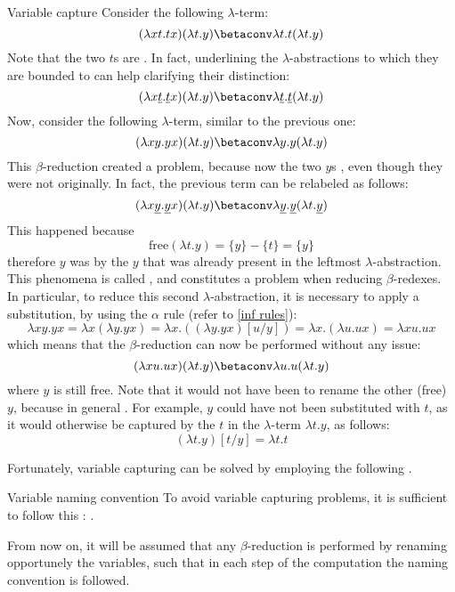 \documentclass[a4paper, 12pt]{report}
\begin{document}
    \begin{framedobs}{Variable capture}
        Consider the following $\lambda$-term: $$(\lambda xt.tx)(\lambda t.y) \betaconv \lambda t.t(\lambda t.y)$$ Note that the two $t$s are . In fact, underlining the $\lambda$-abstractions to which they are bounded to can help clarifying their distinction: $$(\lambda x\underline{t}.\underline{t}x)(\lambda t.y) \betaconv \lambda \underline{t}.\underline{t}(\lambda t.y)$$ Now, consider the following $\lambda$-term, similar to the previous one: $$(\lambda xy.yx)(\lambda t.y) \betaconv \lambda y.y(\lambda t.y)$$ This $\beta$-reduction created a problem, because now the two $y$s , even though they were not originally. In fact, the previous term can be relabeled as follows: $$(\lambda x \underline y. \underline y x)(\lambda t.y) \betaconv \lambda \underline y. \underline y (\lambda t. \underline y)$$ This happened because $$\mathrm{free}(\lambda t.y) = \{y\} - \{t\} = \{y\}$$ therefore $y$ was  by the $y$ that was already present in the leftmost $\lambda$-abstraction. This phenomena is called , and constitutes a problem when reducing $\beta$-redexes. In particular, to reduce this second $\lambda$-abstraction, it is necessary to apply a substitution, by using the $\alpha$ rule (refer to \cref{inf rules}): $$\lambda xy.yx = \lambda x(\lambda y.yx) = \lambda x.((\lambda y.yx)[u/y]) = \lambda x.(\lambda u.ux) = \lambda x u. ux$$ which means that the $\beta$-reduction can now be performed without any issue: $$(\lambda xu.ux)(\lambda t.y) \betaconv \lambda u.u(\lambda t.y)$$ where $y$ is still free. Note that it would not have been  to rename the other (free) $y$, because in general . For example, $y$ could have not been substituted with $t$, as it would otherwise be captured by the $t$ in the $\lambda$-term $\lambda t.y$, as follows: $$(\lambda t.y)[t/y] =\lambda t.t$$
    \end{framedobs}

    Fortunately, variable capturing can be solved by employing the following .

    \begin{frameddefn}{Variable naming convention}
        To avoid variable capturing problems, it is sufficient to follow this : .

        From now on, it will be assumed that any $\beta$-reduction is performed by renaming opportunely the  variables, such that in each step of the computation the naming convention is followed.
    \end{frameddefn}
\end{document}
